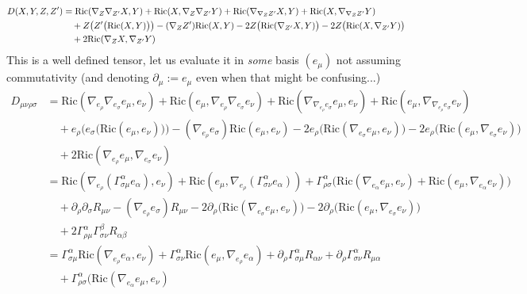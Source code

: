\documentclass[a4paper,11pt]{article}
\numberwithin{equation}{section}
\theoremstyle{definition}
\newcommand{\R}{{\mathrm{Ric}}}
\begin{document}
\begin{align}
    D(X,Y,Z,Z') 
    &=\R(\nabla_Z\nabla_{Z'} X ,Y )
    + \R( X ,\nabla_Z\nabla_{Z'} Y )
    + \R(\nabla_{\nabla_ZZ'} X , Y )
    + \R( X ,\nabla_{\nabla_ZZ'}Y )\notag\\
    & \quad + Z\big(Z'\big(\R(X ,Y )\big)\big)-(\nabla_Z Z')\R(X ,Y )
    -2 Z\big(\R(\nabla_{Z'} X , Y )\big)
    -2 Z\big(\R(X , \nabla_{Z'} Y )\big) \notag\\
    & \quad + 2 \R(\nabla_Z X , \nabla_{Z'} Y ) 
\end{align} 
This is a well defined tensor, let us evaluate it in \textit{some} basis $(e_\mu)$ not assuming commutativity (and denoting $\partial_\mu := e_\mu$ even when that might be confusing...)
\begin{align*}
    D_{\mu\nu\rho\sigma} 
    &=\R(\nabla_{e_\rho}\nabla_{e_\sigma} e_\mu ,e_\nu )
    + \R( e_\mu ,\nabla_{e_\rho}\nabla_{e_\sigma} e_\nu )
    + \R(\nabla_{\nabla_{e_\rho}e_\sigma} e_\mu , e_\nu )
    + \R( e_\mu ,\nabla_{\nabla_{e_\rho}e_\sigma}e_\nu ) \\
    & \quad + {e_\rho}\big(e_\sigma\big(\R(e_\mu ,e_\nu )\big)\big)-(\nabla_{e_\rho} e_\sigma)\R(e_\mu ,e_\nu )
    -2 {e_\rho}\big(\R(\nabla_{e_\sigma} e_\mu , e_\nu )\big)
    -2 {e_\rho}\big(\R(e_\mu , \nabla_{e_\sigma} e_\nu )\big)  \\
    & \quad + 2 \R(\nabla_{e_\rho} e_\mu , \nabla_{e_\sigma} e_\nu ) \\
    &=\R(\nabla_{e_\rho}\left(\Gamma_{\sigma\mu}^\alpha e_\alpha \right),e_\nu )
    + \R( e_\mu ,\nabla_{e_\rho}\left(\Gamma_{\sigma\nu}^\alpha e_\alpha \right) )
    + \Gamma_{\rho\sigma}^\alpha \Big(
    \R(\nabla_{e_\alpha} e_\mu , e_\nu )
    + \R( e_\mu ,\nabla_{e_\alpha}e_\nu )\Big) \\
    & \quad + \partial_\rho \partial_\sigma R_{\mu\nu} -(\nabla_{e_\rho} e_\sigma) R_{\mu\nu}
    -2 \partial_\rho \big(\R(\nabla_{e_\sigma} e_\mu , e_\nu )\big)
    -2 \partial_\rho\big(\R(e_\mu , \nabla_{e_\sigma} e_\nu )\big)  \\
    & \quad + 2 \Gamma_{\rho\mu}^\alpha \Gamma_{\sigma\nu}^\beta R_{\alpha\beta}\\
    &=\Gamma_{\sigma\mu}^\alpha\R(\nabla_{e_\rho}e_\alpha ,e_\nu )
    + \Gamma_{\sigma\nu}^\alpha\R( e_\mu ,\nabla_{e_\rho}e_\alpha )
    + \partial_\rho \Gamma_{\sigma\mu}^\alpha R_{\alpha\nu}
    + \partial_\rho\Gamma_{\sigma\nu}^\alpha R_{\mu\alpha} \\
    &\quad 
    + \Gamma_{\rho\sigma}^\alpha \Big(
    \R(\nabla_{e_\alpha} e_\mu , e_\nu )

\end{align*}
\end{document}
